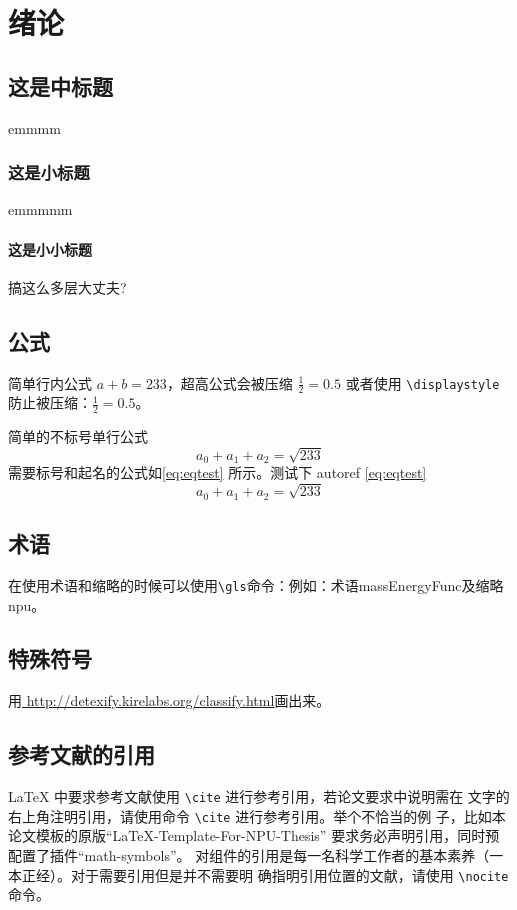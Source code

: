\documentclass[lang=chs, degree=phd, blindreview=false, winfonts=true, academic=true]{yanputhesis}
\begin{document}
\chapter{绪论}
\section{这是中标题}
emmmm
\subsection{这是小标题}
emmmmm
\subsubsection{这是小小标题}
搞这么多层大丈夫?

\section{公式}
简单行内公式 $a+b=233$，超高公式会被压缩 $\frac{1}{2}=0.5$ 或者使用
\lstinline`\displaystyle` 防止被压缩：$\displaystyle \frac{1}{2}=0.5$。

简单的不标号单行公式
$$a_0+a_1+a_2=\sqrt{233}$$
需要标号和起名的公式如\autoref{eq:eqtest} 所示。测试下 autoref \autoref{eq:eqtest}
\begin{equation}
    \label{eq:eqtest}
    a_0 + a_1 + a_2 = \sqrt{233}
\end{equation}

\section{术语}

在使用术语和缩略的时候可以使用\lstinline`\gls`命令：例如：术语\gls{massEnergyFunc}及缩略\gls{npu}。

\section{特殊符号}

用\href{http://detexify.kirelabs.org/classify.html}{
    http://detexify.kirelabs.org/classify.html}画出来。

\section{参考文献的引用}

\LaTeX{} 中要求参考文献使用 \lstinline`\cite` 进行参考引用，若论文要求中说明需在
文字的右上角注明引用，请使用命令 \lstinline`\cite` 进行参考引用。举个不恰当的例
子，比如本论文模板的原版“LaTeX-Template-For-NPU-Thesis”\cite{NWPUThesisLaTeXTemplate}
要求务必声明引用，同时预配置了插件“math-symbols”\cite{MathSymbolsinLaTeXbypolossk}。
对组件的引用是每一名科学工作者的基本素养（一本正经）。对于需要引用但是并不需要明
确指明引用位置的文献，请使用 \lstinline`\nocite` 命令。
\end{document}
